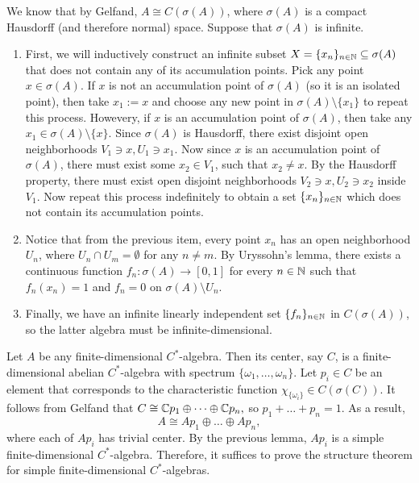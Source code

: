 \begin{myproof}
  We know that by Gelfand, $A \cong C(\sigma(A))$, where $\sigma(A)$ is a compact Hausdorff (and therefore normal) space. Suppose that $\sigma(A)$ is infinite.
  \begin{enumerate}
        \item   First, we will inductively construct an infinite subset $X = \{x_n\}_{n \in \mathbb {N}} \subseteq \sigma(A)$ that does not contain any of its accumulation points.
      Pick any point $x \in \sigma(A)$. 
      If $x$ is not an accumulation point of $\sigma(A)$ (so it is an isolated point),
      then take $x_1 := x$ and choose any new point in $\sigma(A) \setminus \{ x_1\}$ to repeat this process.
      Howevery, if $x$ is an accumulation point of $\sigma(A)$, then take any $x_1 \in \sigma(A) \setminus \{x\}$. Since $\sigma(A)$ is Hausdorff,
      there exist disjoint open neighborhoods $V_1 \ni x, U_1 \ni x_1$. Now since $x$ is an accumulation point of $\sigma(A)$,
      there must exist some $x_2 \in V_1$, such that $x_2 \neq x$. By the Hausdorff property, there must exist open disjoint neighborhoods 
      $V_2 \ni x, U_2 \ni x_2$ inside $V_1$. Now repeat this process indefinitely to obtain a set $\{x_n\}_{n \in \mathbb {N}}$
      which does not contain its accumulation points.
        \item Notice that from the previous item, every point $x_n$ has an open neighborhood $U_n$, where $U_n \cap U_m = \emptyset$ for any $n \neq m$.
      By Uryssohn's lemma, there exists a continuous function $f_n: \sigma(A) \to [0, 1]$ for every $n \in \mathbb {N}$ such that $f_n (x_n) = 1$
      and $f_n = 0$ on $\sigma(A) \setminus U_n$.
        \item Finally, we have an infinite linearly independent set $\{f_n\}_{n \in \mathbb {N}}$ in $C(\sigma(A))$,
        so the latter algebra must be infinite-dimensional. \qedhere
  \end{enumerate}  
\end{myproof}

Let $A$ be any finite-dimensional $C^*$-algebra. Then its center, say $C$,
is a finite-dimensional abelian $C^*$-algebra with spectrum $\{\omega_1, \dots, \omega_n\}$.
Let $p_i \in C$ be an element that corresponds to the characteristic function $\chi_{\{\omega_i\}} \in C(\sigma(C))$.
It follows from Gelfand that $C \cong \mathbb {C} p_1 \oplus \cdots \oplus \mathbb {C} p_n,$
so $p_1 + \dots + p_n = 1$. As a result, 
$$A \cong A p_1 \oplus \dots \oplus A p_n,$$
where each of $A p_i$ has trivial center. By the previous lemma, $A p_i$
is a simple finite-dimensional $C^*$-algebra. Therefore, it suffices to prove the structure theorem for simple finite-dimensional $C^*$-algebras.

